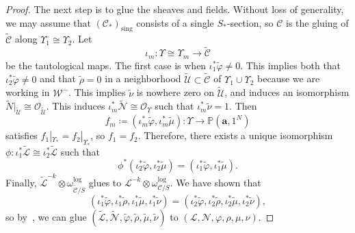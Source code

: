 \documentclass{amsart}
\theoremstyle{definition}
\theoremstyle{remark}
\theoremstyle{plain}
\theoremstyle{definition}
\theoremstyle{remark}
\renewcommand{\P}{\mathbb{P}}
\newcommand{\ba}{\mathbf{a}}
\newcommand{\mc}[1]{\mathcal{#1}}
\newcommand{\mr}[1]{\mathrm{#1}}
\newcommand{\wt}[1]{\widetilde{#1}}
\newcommand{\1}{\mathbf{1}}
\newcommand{\2}{\mathbf{2}}
\newcommand{\3}{\mathbf{3}}
\begin{document}
\begin{proof}
    The next step is to glue the sheaves and fields. Without loss of generality, we may assume that $(\mc{C}_*)_{\mr{sing}}$ consists of a single $S_*$-section, so $\mc{C}$ is the gluing of $\wt{\mc{C}}$ along $\Upsilon_1 \cong \Upsilon_2$. Let 
    \[ \iota_m \colon \Upsilon \cong \Upsilon_m \to \wt{\mc{C}} \]
    be the tautological maps. The first case is when $\iota_1^* \wt{\varphi} \neq 0$. This implies both that $\iota_2^* \wt{\varphi} \neq 0$ and that $\wt{\rho} = 0$ in a neighborhood $\wt{\mc{U}} \subset \wt{\mc{C}}$ of $\Upsilon_1 \cup \Upsilon_2$ because we are working in $\mc{W}^-$. This implies $\wt{\nu}$ is nowhere zero on $\wt{\mc{U}}$, and induces an isomorphism $\wt{N}|_{\wt{\mc{U}}} \cong \mc{O}_{\wt{\mc{U}}}$. This induces $\iota_m^* \wt{\mc{N}} \cong \mc{O}_{\Upsilon}$ such that $\iota_m^* \wt{\nu} = 1$. Then
    \[ f_m \coloneqq (\iota_m^*\wt{\varphi}, \iota_m^* \wt{\mu}) \colon \Upsilon \to \P(\ba,1^N) \]
    satisfies $f_1 |_{\Upsilon_*} = f_2|_{\Upsilon_*}$, so $f_1 = f_2$. Therefore, there exists a unique isomorphism $\phi \colon \iota_1^* \wt{\mc{L}} \cong \iota_2^* \wt{\mc{L}}$ such that
    \[ \phi^* (\iota_2^* \wt{\varphi}, \iota_2^* \wt{\mu}) = (\iota_1^* \wt{\varphi}, \iota_1^* \wt{\mu}). \]
    Finally, $\wt{\mc{L}}^{-k} \otimes \omega_{\wt{\mc{C}}/S}^{\log}$ glues to $\mc{L}^{-k} \otimes \omega_{\mc{C}/S}^{\log}$. We have shown that
    \[ (\iota_1^* \wt{\varphi},\iota_1^* \wt{\rho}, \iota_1^* \wt{\mu}, \iota_1^* \wt{\nu}) = (\iota_2^* \wt{\varphi},\iota_2^* \wt{\rho}, \iota_2^* \wt{\mu}, \iota_2^* \wt{\nu}), \]
    so by~\cite[Corollary 3.22]{mspfermat}, we can glue $(\wt{\mc{L}},\wt{\mc{N}},\wt{\varphi},\wt{\rho},\wt{\mu},\wt{\nu})$ to $(\mc{L},\mc{N},\varphi,\rho,\mu,\nu)$.


\end{proof}
\end{document}
